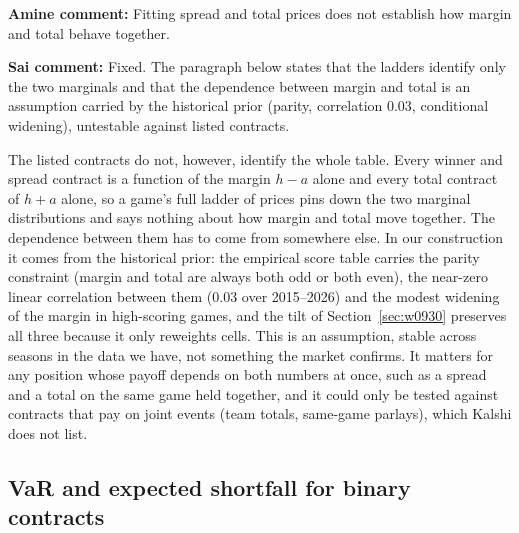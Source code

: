 \documentclass[11pt]{article}
\begin{document}
{\color{red}\textbf{Amine comment:} Fitting spread and total prices does not establish how margin and total behave together.}

{\color{blue}\textbf{Sai comment:} Fixed. The paragraph below states that the ladders identify only the two marginals and that the dependence between margin and total is an assumption carried by the historical prior (parity, correlation 0.03, conditional widening), untestable against listed contracts.}

The listed contracts do not, however, identify the whole table. Every winner and spread contract is a function of the margin $h-a$ alone and every total contract of $h+a$ alone, so a game's full ladder of prices pins down the two marginal distributions and says nothing about how margin and total move together. The dependence between them has to come from somewhere else. In our construction it comes from the historical prior: the empirical score table carries the parity constraint (margin and total are always both odd or both even), the near-zero linear correlation between them (0.03 over 2015--2026) and the modest widening of the margin in high-scoring games, and the tilt of Section~\ref{sec:w0930} preserves all three because it only reweights cells. This is an assumption, stable across seasons in the data we have, not something the market confirms. It matters for any position whose payoff depends on both numbers at once, such as a spread and a total on the same game held together, and it could only be tested against contracts that pay on joint events (team totals, same-game parlays), which Kalshi does not list.

\subsection{VaR and expected shortfall for binary contracts}\label{sec:binaryvar}
\end{document}
